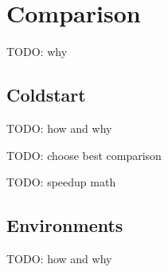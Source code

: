 \section{Comparison}\label{sec:comparison}

TODO: why

\subsection{Coldstart}

TODO: how and why

TODO: choose best comparison

TODO: speedup math





\subsection{Environments}

TODO: how and why


